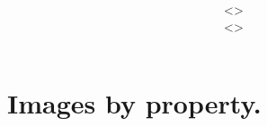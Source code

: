 \documentclass[12pt,a4paper]{article}
\title{\vspace{2in}\textmd{\hmwkClass\\\textbf{\hmwkTitle}}\\\normalsize\vspace{0.1in}\small{\hmwkDueDate}\\\vspace{4in}}
\date{}
\author{
\textbf{\hmwkAuthorNameA} <\texttt{\href{mailto:ruizcep2@illinois.edu}{\hmwkAuthorEmailA}}> \\
\textbf{\hmwkAuthorNameB} <\texttt{\href{mailto:ruizcep2@illinois.edu}{\hmwkAuthorEmailB}}>}
\begin{document}
\begin{singlespace}

\begin{titlepage}
\maketitle
\thispagestyle{empty}
\end{titlepage}

\hypertarget{toc}{}
\tableofcontents
\newpage



\clearpage

\newcommand{\e}[1]{\emph{#1}\xspace}

\section{Images by property.}

\newcommand{\imageSize}{0.1}
\newcommand{\spaceSize}{-0.015}
\newcommand{\plotminifigure}[1]
{
\begin{minipage}{\imageSize\textwidth}
    \centering
    \texttt{[image: \#1]}
\end{minipage}
\hspace{\spaceSize\textwidth}
}

\newcommand{\plotpropertiesimages}[2]
{
    \begin{figure}[!ht]
        \foreach \n in {#2} {\plotminifigure{\n}}
        \caption{{\large \textbf{#1}}}
    \end{figure}
    \FloatBarrier
}


\end{singlespace}
\end{document}
